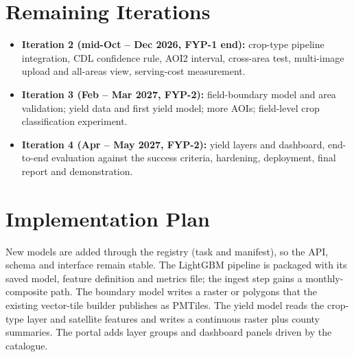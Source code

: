 \section{Remaining Iterations}
\begin{itemize}
  \item \textbf{Iteration 2 (mid-Oct -- Dec 2026, FYP-1 end):} crop-type pipeline integration, CDL
        confidence rule, AOI2 interval, cross-area test, multi-image upload and all-areas view,
        serving-cost measurement.
  \item \textbf{Iteration 3 (Feb -- Mar 2027, FYP-2):} field-boundary model and area validation; yield
        data and first yield model; more AOIs; field-level crop classification experiment.
  \item \textbf{Iteration 4 (Apr -- May 2027, FYP-2):} yield layers and dashboard, end-to-end evaluation
        against the success criteria, hardening, deployment, final report and demonstration.
\end{itemize}

\section{Implementation Plan}
New models are added through the registry (task and manifest), so the API, schema and interface
remain stable. The LightGBM pipeline is packaged with its saved model, feature definition and
metrics file; the ingest step gains a monthly-composite path. The boundary model writes a raster
or polygons that the existing vector-tile builder publishes as PMTiles. The yield model reads the
crop-type layer and satellite features and writes a continuous raster plus county summaries. The
portal adds layer groups and dashboard panels driven by the catalogue.

